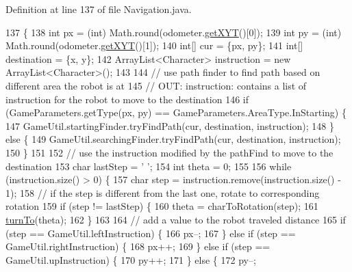 Definition at line 137 of file Navigation.\+java.


\begin{DoxyCode}
137                                                                   \{
138     \textcolor{keywordtype}{int} px = (int) Math.round(odometer.\hyperlink{classca_1_1mcgill_1_1ecse211_1_1odometer_1_1_odometer_data_a8f40f0264c68f0cbed4fff1723ae7863}{getXYT}()[0]);
139     \textcolor{keywordtype}{int} py = (int) Math.round(odometer.\hyperlink{classca_1_1mcgill_1_1ecse211_1_1odometer_1_1_odometer_data_a8f40f0264c68f0cbed4fff1723ae7863}{getXYT}()[1]);
140     \textcolor{keywordtype}{int}[] cur = \{px, py\};
141     \textcolor{keywordtype}{int}[] destination = \{x, y\};
142     ArrayList<Character> instruction = \textcolor{keyword}{new} ArrayList<Character>();
143 
144     \textcolor{comment}{// use path finder to find path based on different area the robot is at}
145     \textcolor{comment}{// OUT: instruction: contains a list of instruction for the robot to move to the destination}
146     \textcolor{keywordflow}{if} (GameParameters.getType(px, py) == GameParameters.AreaType.InStarting) \{
147       GameUtil.startingFinder.tryFindPath(cur, destination, instruction);
148     \} \textcolor{keywordflow}{else} \{
149       GameUtil.searchingFinder.tryFindPath(cur, destination, instruction);
150     \}
151 
152     \textcolor{comment}{// use the instruction modified by the pathFind to move to the destination}
153     \textcolor{keywordtype}{char} lastStep = \textcolor{charliteral}{' '};
154     \textcolor{keywordtype}{int} theta = 0;
155 
156     \textcolor{keywordflow}{while} (instruction.size() > 0) \{
157       \textcolor{keywordtype}{char} step = instruction.remove(instruction.size() - 1);
158       \textcolor{comment}{// if the step is different from the last one, rotate to corresponding rotation}
159       \textcolor{keywordflow}{if} (step != lastStep) \{
160         theta = charToRotation(step);
161         \hyperlink{classca_1_1mcgill_1_1ecse211_1_1project_1_1_navigation_a3bbe0645f2b3b3d0986b4a707fb5a00c}{turnTo}(theta);
162       \}
163 
164       \textcolor{comment}{// add a value to the robot traveled distance}
165       \textcolor{keywordflow}{if} (step == GameUtil.leftInstruction) \{
166         px--;
167       \} \textcolor{keywordflow}{else} \textcolor{keywordflow}{if} (step == GameUtil.rightInstruction) \{
168         px++;
169       \} \textcolor{keywordflow}{else} \textcolor{keywordflow}{if} (step == GameUtil.upInstruction) \{
170         py++;
171       \} \textcolor{keywordflow}{else} \{
172         py--;

\end{DoxyCode}
